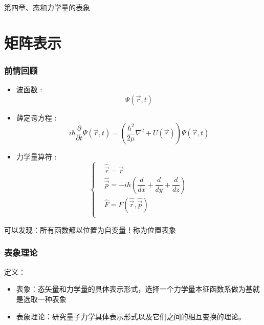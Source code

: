 \begin{frame} [plain]
    \frametitle{}
    \begin{center}
    { {\huge 第四章、态和力学量的表象}}
    \end{center}  
    \addtocounter{framenumber}{-1}   
\end{frame}

\section{矩阵表示}

\begin{frame}
    \frametitle{前情回顾}
    \begin{itemize}
        \item 波函数 : $$ \Psi(\vec{r},t)$$
        \item 薛定谔方程 :     
        \begin{equation*}
            i\hbar \frac{\partial }{\partial t} \Psi(\vec{r},t) = (\frac{\hbar^2}{2\mu} \nabla^2 +U(\vec{r})) \Psi(\vec{r},t)
        \end{equation*}
        \item 力学量算符 :
        $$\left\{ \begin{aligned}
            &\hat{\vec{r}} =\vec{r}  \\
            &\hat{\vec{p}} =-i\hbar(\dfrac{d}{d x}+ \dfrac{d}{d y} + \dfrac{d}{d z}) \\
            &\hat{F}=F(\hat{\vec{r}},\hat{\vec{p}}) \\
        \end{aligned} \right.$$
    \end{itemize}   
    可以发现：所有函数都以位置为自变量！称为位置表象
\end{frame} 
%
\begin{frame} 
    \frametitle{表象理论}
    \begin{tcolorbox1}{定义：}
        \begin{itemize}
            \item 表象：态矢量和力学量的具体表示形式，选择一个力学量本征函数系做为基就是选取一种表象
            \item 表象理论：研究量子力学具体表示形式以及它们之间的相互变换的理论。
        \end{itemize}
    \end{tcolorbox1}
\end{frame} 

